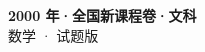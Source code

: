 \documentclass[zihao=-4, a4paper]{ctexart}
\begin{document}
\begin{center}
  {\Large\bfseries 2000 年·全国新课程卷·文科}\\[4pt]
  {\large 数学 · 试题版}
\end{center}
\medskip
{}

\end{document}
